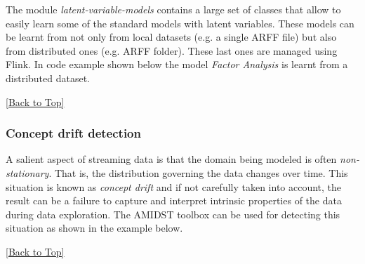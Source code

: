 \documentclass[10pt,a4paper]{article}
\begin{document}
The module \textit{latent-variable-models} contains a large set of classes that allow to easily learn some of the standard models with latent variables. These models can be learnt from not only from local datasets (e.g. a single ARFF file) but also from distributed ones (e.g. ARFF folder). These last ones are managed using Flink. In code example shown below the model \textit{Factor Analysis} is learnt from a distributed dataset.  


\hyperref[sec:flinklink]{[Back to Top]}\newline 




\subsubsection{Concept drift detection}\label{sec:flinklink:ext:conceptdrift}

A salient aspect of streaming data is that the domain
being modeled is often \emph{non-stationary}. That is, the distribution governing the data changes over time.
This situation is known as \textit{concept drift} and if not carefully taken into account, the
result can be a failure to capture and
interpret intrinsic properties of the data during data exploration. The AMIDST toolbox can be used for detecting this situation as shown in the example below.\newline 







\hyperref[sec:flinklink]{[Back to Top]}\newline 
\end{document}
